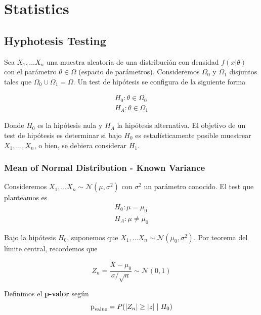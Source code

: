 \section{Statistics}

\subsection{Hyphotesis Testing}

Sea $X_1, \dots X_n$ una muestra aleatoria de una distribución con densidad $f(x|\theta)$ con el parámetro $\theta \in \Omega$ (espacio de parámetros). Consideremos $\Omega_0$ y $\Omega_1$ disjuntos tales que $\Omega_0 \cup \Omega_1 = \Omega$. Un test de hipótesis se configura de la siguiente forma 

\begin{equation*}
\begin{aligned}
    H_0: \theta \in \Omega_0 \\ 
    H_A: \theta \in \Omega_1
\end{aligned}
\end{equation*}

Donde $H_0$ es la hipótesis nula y $H_A$ la hipótesis alternativa. El objetivo de un test de hipótesis es determinar si bajo $H_0$ es estadísticamente posible muestrear $X_1 , \dots, X_n$, o bien, se debiera considerar $H_1$.

\subsubsection{Mean of Normal Distribution - Known Variance}

Consideremos $X_1 , \dots X_n \sim \mathcal{N}(\mu, \sigma^2)$ con $\sigma^2$ un parámetro conocido. El test que planteamos es 
\begin{equation*}
\begin{aligned}
    H_0: \mu = \mu_0 \\ 
    H_A: \mu \neq \mu_0
\end{aligned}
\end{equation*}

Bajo la hipótesis $H_0$, suponemos que $X_1, \dots X_n \sim \mathcal{N}(\mu_0, \sigma^2)$. Por teorema del límite central, recordemos que 

$$ 
Z_n = \frac{\overline{X} - \mu_0}{\sigma / \sqrt{n}} \sim \mathcal{N}(0,1)
$$

Definimos el \textbf{p-valor} según
$$
\text{p}_{\text{value}} = P(|Z_n| \geq |z| \hspace{0.1cm} |\hspace{0.1cm} H_0) 
$$

